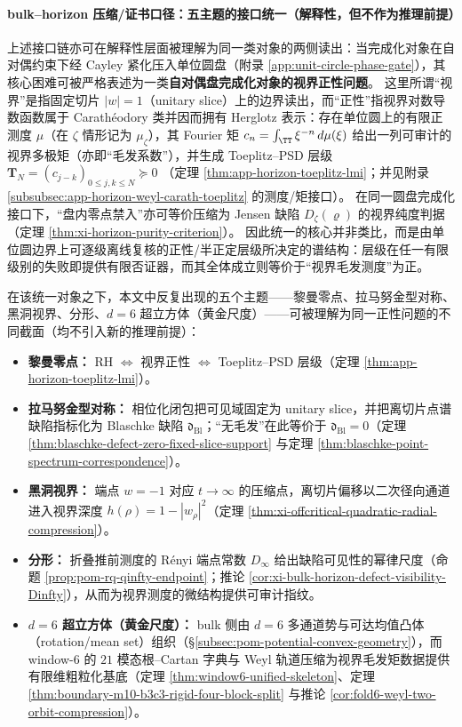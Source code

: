 \paragraph{bulk--horizon 压缩/证书口径：五主题的接口统一（解释性，但不作为推理前提）}
上述接口链亦可在解释性层面被理解为同一类对象的两侧读出：当完成化对象在自对偶约束下经 Cayley 紧化压入单位圆盘（附录 \ref{app:unit-circle-phase-gate}），其核心困难可被严格表述为一类\textbf{自对偶盘完成化对象的视界正性问题}。
这里所谓“视界”是指固定切片 \(|w|=1\)（unitary slice）上的边界读出，而“正性”指视界对数导数函数属于 Carath\'eodory 类并因而拥有 Herglotz 表示：存在单位圆上的有限正测度 \(\mu\)（在 \(\zeta\) 情形记为 \(\mu_{\zeta}\)），其 Fourier 矩
\(
c_n=\int_{\TT}\xi^{-n}\,d\mu(\xi)
\)
给出一列可审计的视界多极矩（亦即“毛发系数”），并生成 Toeplitz--PSD 层级
\(
\mathbf{T}_N=(c_{j-k})_{0\le j,k\le N}\succeq 0
\)
（定理 \ref{thm:app-horizon-toeplitz-lmi}；并见附录 \ref{subsubsec:app-horizon-weyl-carath-toeplitz} 的测度/矩接口）。
在同一圆盘完成化接口下，“盘内零点禁入”亦可等价压缩为 Jensen 缺陷 \(D_{\zeta}(\varrho)\) 的视界纯度判据（定理 \ref{thm:xi-horizon-purity-criterion}）。
因此统一的核心并非类比，而是由单位圆边界上可逐级离线复核的正性/半正定层级所决定的谱结构：层级在任一有限级别的失败即提供有限否证器，而其全体成立则等价于“视界毛发测度”为正。

在该统一对象之下，本文中反复出现的五个主题——黎曼零点、拉马努金型对称、黑洞视界、分形、\(d=6\) 超立方体（黄金尺度）——可被理解为同一正性问题的不同截面（均不引入新的推理前提）：
\begin{itemize}
  \item \textbf{黎曼零点：} RH \(\Leftrightarrow\) 视界正性 \(\Leftrightarrow\) Toeplitz--PSD 层级（定理 \ref{thm:app-horizon-toeplitz-lmi}）。
  \item \textbf{拉马努金型对称：} 相位化闭包把可见域固定为 unitary slice，并把离切片点谱缺陷指标化为 Blaschke 缺陷 \(\mathfrak d_{\mathrm{Bl}}\)；“无毛发”在此等价于 \(\mathfrak d_{\mathrm{Bl}}=0\)（定理 \ref{thm:blaschke-defect-zero-fixed-slice-support} 与定理 \ref{thm:blaschke-point-spectrum-correspondence}）。
  \item \textbf{黑洞视界：} 端点 \(w=-1\) 对应 \(t\to\infty\) 的压缩点，离切片偏移以二次径向通道进入视界深度 \(h(\rho)=1-|w_\rho|^2\)（定理 \ref{thm:xi-offcritical-quadratic-radial-compression}）。
  \item \textbf{分形：} 折叠推前测度的 Rényi 端点常数 \(D_\infty\) 给出缺陷可见性的幂律尺度（命题 \ref{prop:pom-rq-qinfty-endpoint}；推论 \ref{cor:xi-bulk-horizon-defect-visibility-Dinfty}），从而为视界测度的微结构提供可审计指纹。
  \item \textbf{\(d=6\) 超立方体（黄金尺度）：} bulk 侧由 \(d=6\) 多通道势与可达均值凸体（rotation/mean set）组织（\S\ref{subsec:pom-potential-convex-geometry}），而 window-\(6\) 的 \(21\) 模态根--Cartan 字典与 Weyl 轨道压缩为视界毛发矩数据提供有限维粗粒化基底（定理 \ref{thm:window6-unified-skeleton}、定理 \ref{thm:boundary-m10-b3c3-rigid-four-block-split} 与推论 \ref{cor:fold6-weyl-two-orbit-compression}）。
\end{itemize}

